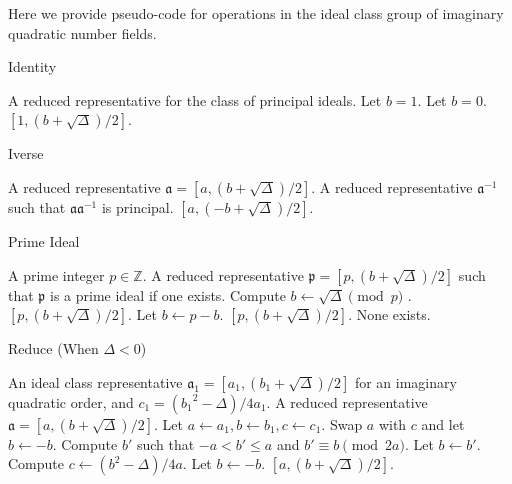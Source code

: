 \documentclass{ucalgthes1}
\theoremstyle{plain}
\theoremstyle{definition}
\newcommand{\ZZ}{\mathbb{Z}}
\begin{document}
Here we provide pseudo-code for operations in the ideal class group of imaginary quadratic number fields.  

\begin{algorithm}[h]
\caption{Identity}
\label{alg:identity}
\begin{algorithmic}[1]
\ENSURE A reduced representative for the class of principal ideals.
	\STATE Let $b = 1$.
\ELSE
	\STATE Let $b = 0$.
\ENDIF
\RETURN $[1, (b+\sqrt\Delta)/2]$.
\end{algorithmic}
\end{algorithm}

\begin{algorithm}[h]
\caption{Iverse}
\label{alg:inverse}
\begin{algorithmic}[1]
\REQUIRE A reduced representative $\mathfrak a = [a, (b+\sqrt\Delta)/2]$.
\ENSURE A reduced representative $\mathfrak a^{-1}$ such that $\mathfrak a \mathfrak a^{-1}$ is principal.
\RETURN $[a, (-b+\sqrt\Delta)/2]$.
\end{algorithmic}
\end{algorithm}


\begin{algorithm}[h]
\caption{Prime Ideal}
\label{alg:prime}
\begin{algorithmic}[1]
\REQUIRE A prime integer $p \in \ZZ$.
\ENSURE A reduced representative $\mathfrak p = [p, (b+\sqrt\Delta)/2]$ such that $\mathfrak p$ is a prime ideal if one exists.
\STATE Compute $b \leftarrow \sqrt\Delta \pmod p$ .
	\RETURN $[p, (b+\sqrt\Delta)/2]$.	
\ENDIF
\STATE Let $b \leftarrow p-b$.
	\RETURN $[p, (b+\sqrt\Delta)/2]$.	
\ENDIF
\RETURN None exists.
\end{algorithmic}
\end{algorithm}


\begin{algorithm}[h]
\caption{Reduce (When $\Delta < 0$)}
\label{alg:reduce}
\begin{algorithmic}[1]
\REQUIRE An ideal class representative $\mathfrak a_1 = [a_1, (b_1+\sqrt\Delta)/2]$ for an imaginary quadratic order, and $c_1 = ({b_1}^2 - \Delta)/4a_1$.
\ENSURE A reduced representative $\mathfrak a = [a, (b+\sqrt\Delta)/2]$.
\STATE Let $a \leftarrow a_1, b \leftarrow b_1, c \leftarrow c_1$.
		\STATE Swap $a$ with $c$ and let $b \leftarrow -b$.
	\ENDIF
		\STATE Compute $b'$ such that $-a < b' \le a$ and $b' \equiv b \pmod{2a}$.
		\STATE Let $b \leftarrow b'$.
		\STATE Compute $c \leftarrow (b^2-\Delta)/4a$.
	\ENDIF
\ENDWHILE
{}
	\STATE Let $b \leftarrow -b$.
\ENDIF
\RETURN $[a, (b+\sqrt\Delta)/2]$.
\end{algorithmic}
\end{algorithm}
\end{document}
